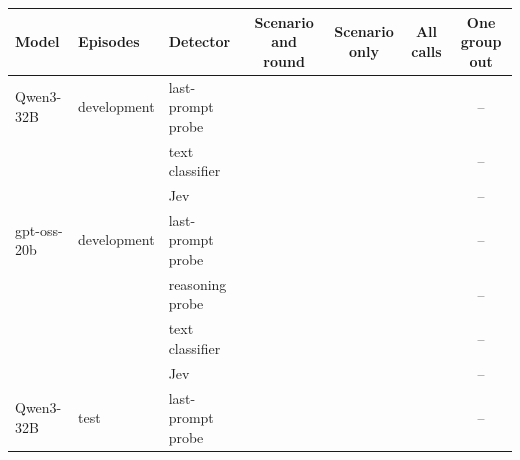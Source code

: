 \begin{tabular}{@{}lllcccc@{}}
\toprule
Model & Episodes & Detector & Scenario and round & Scenario only & All calls & One group out \\
\midrule
Qwen3-32B & development & last-prompt probe & \eEighteenQwenDevProbeRound{} \eEighteenQwenDevProbeRoundCI{} & \eEighteenQwenDevProbeScenario{} \eEighteenQwenDevProbeScenarioCI{} & \eEighteenQwenDevProbePooled{} \eEighteenQwenDevProbePooledCI{} & \eEighteenQwenDevProbeDropMin{}--\eEighteenQwenDevProbeDropMax{} \\
 &  & text classifier & \eEighteenQwenDevTextRound{} \eEighteenQwenDevTextRoundCI{} & \eEighteenQwenDevTextScenario{} \eEighteenQwenDevTextScenarioCI{} & \eEighteenQwenDevTextPooled{} \eEighteenQwenDevTextPooledCI{} & \eEighteenQwenDevTextDropMin{}--\eEighteenQwenDevTextDropMax{} \\
 &  & Jev & \eEighteenQwenDevJevRound{} \eEighteenQwenDevJevRoundCI{} & \eEighteenQwenDevJevScenario{} \eEighteenQwenDevJevScenarioCI{} & \eEighteenQwenDevJevPooled{} \eEighteenQwenDevJevPooledCI{} & \eEighteenQwenDevJevDropMin{}--\eEighteenQwenDevJevDropMax{} \\
gpt-oss-20b & development & last-prompt probe & \eEighteenGptDevProbeRound{} \eEighteenGptDevProbeRoundCI{} & \eEighteenGptDevProbeScenario{} \eEighteenGptDevProbeScenarioCI{} & \eEighteenGptDevProbePooled{} \eEighteenGptDevProbePooledCI{} & \eEighteenGptDevProbeDropMin{}--\eEighteenGptDevProbeDropMax{} \\
 &  & reasoning probe & \eEighteenGptDevReasoningRound{} \eEighteenGptDevReasoningRoundCI{} & \eEighteenGptDevReasoningScenario{} \eEighteenGptDevReasoningScenarioCI{} & \eEighteenGptDevReasoningPooled{} \eEighteenGptDevReasoningPooledCI{} & \eEighteenGptDevReasoningDropMin{}--\eEighteenGptDevReasoningDropMax{} \\
 &  & text classifier & \eEighteenGptDevTextRound{} \eEighteenGptDevTextRoundCI{} & \eEighteenGptDevTextScenario{} \eEighteenGptDevTextScenarioCI{} & \eEighteenGptDevTextPooled{} \eEighteenGptDevTextPooledCI{} & \eEighteenGptDevTextDropMin{}--\eEighteenGptDevTextDropMax{} \\
 &  & Jev & \eEighteenGptDevJevRound{} \eEighteenGptDevJevRoundCI{} & \eEighteenGptDevJevScenario{} \eEighteenGptDevJevScenarioCI{} & \eEighteenGptDevJevPooled{} \eEighteenGptDevJevPooledCI{} & \eEighteenGptDevJevDropMin{}--\eEighteenGptDevJevDropMax{} \\
Qwen3-32B & test & last-prompt probe & \eEighteenQwenTestProbeRound{} \eEighteenQwenTestProbeRoundCI{} & \eEighteenQwenTestProbeScenario{} \eEighteenQwenTestProbeScenarioCI{} & \eEighteenQwenTestProbePooled{} \eEighteenQwenTestProbePooledCI{} & \eEighteenQwenTestProbeDropMin{}--\eEighteenQwenTestProbeDropMax{} \\

\end{tabular}

